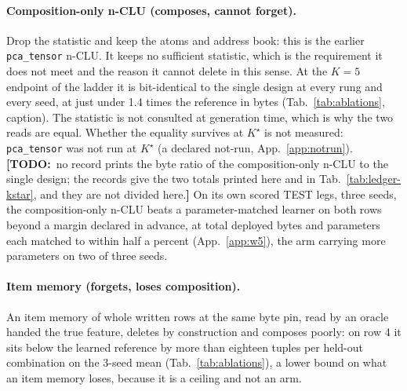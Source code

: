 \documentclass{article} %
\newcommand{\TODO}[1]{{\color{orange}\textbf{[TODO:}~#1\textbf{]}}}
\newcommand{\Kstar}{\ensuremath{K^{\star}}}
\begin{document}
\paragraph{Composition-only n-CLU (composes, cannot forget).} Drop the statistic and keep the
atoms and address book: this is the earlier \texttt{pca\_tensor} n-CLU. It keeps no sufficient
statistic, which is the requirement it does not meet and the reason it cannot delete in this sense. At the
$K=5$ endpoint of the ladder it is bit-identical to the single design at every rung and every
seed, at just under 1.4 times the reference in bytes (Tab.~\ref{tab:ablations}, caption).
The statistic is not consulted at generation time, which is why the two reads are equal.
Whether the equality survives at $\Kstar$ is not measured: \texttt{pca\_tensor} was not run at
$\Kstar$ (a declared not-run, App.~\ref{app:notrun}). \TODO{no record prints the byte ratio of the composition-only n-CLU to the single design;
the records give the two totals printed here and in Tab.~\ref{tab:ledger-kstar}, and they are
not divided here.}
On its own scored TEST legs, three seeds, the composition-only n-CLU beats a parameter-matched
learner on both rows beyond a margin declared in advance, at total deployed bytes and parameters each matched to
within half a percent (App.~\ref{app:w5}), the arm carrying more parameters on two of three seeds.

\paragraph{Item memory (forgets, loses composition).} An item memory of whole written rows at
the same byte pin, read by an oracle handed the true feature, deletes by construction and
composes poorly: on row 4 it sits below the learned
reference by more than eighteen tuples per held-out combination on the 3-seed mean (Tab.~\ref{tab:ablations}), a lower bound on what an item memory
loses, because it is a ceiling and not an arm. %
\end{document}
